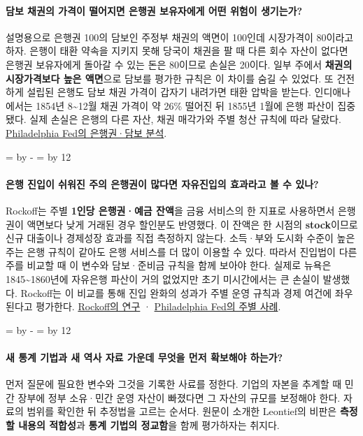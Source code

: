 \documentclass[10pt,a4paper]{article}
\newcommand{\ReserveQuestionSpace}{%
  \par\begingroup
  \dimen0=\pagegoal \advance\dimen0 by -\pagetotal
  \dimen2=\baselineskip \multiply\dimen2 by 12
  \ifdim\dimen0<\dimen2 \newpage\fi
  \endgroup}
\begin{document}
\paragraph{담보 채권의 가격이 떨어지면 은행권 보유자에게 어떤 위험이 생기는가?}
설명용으로 은행권 100의 담보인 주정부 채권의 액면이 100인데 시장가격이 80이라고 하자. 은행이 태환 약속을 지키지 못해 당국이 채권을 팔 때 다른 회수 자산이 없다면 은행권 보유자에게 돌아갈 수 있는 돈은 80이므로 손실은 20이다. 일부 주에서 \textbf{채권의 시장가격보다 높은 액면}으로 담보를 평가한 규칙은 이 차이를 숨길 수 있었다. 또 건전하게 설립된 은행도 담보 채권 가격이 갑자기 내려가면 태환 압박을 받는다. 인디애나에서는 1854년 8\textasciitilde{}12월 채권 가격이 약 26\% 떨어진 뒤 1855년 1월에 은행 파산이 집중됐다. 실제 손실은 은행의 다른 자산, 채권 매각가와 주별 청산 규칙에 따라 달랐다. \href{https://www.philadelphiafed.org/-/media/FRBP/Assets/Economy/Articles/economic-insights/2016/q3/eiq316\_free\_banking\_era.pdf}{Philadelphia Fed의 은행권·담보 분석}.\par

\ReserveQuestionSpace
\paragraph{은행 진입이 쉬워진 주의 은행권이 많다면 자유진입의 효과라고 볼 수 있나?}
Rockoff는 주별 \textbf{1인당 은행권·예금 잔액}을 금융 서비스의 한 지표로 사용하면서 은행권이 액면보다 낮게 거래된 경우 할인분도 반영했다. 이 잔액은 한 시점의 \textbf{stock}이므로 신규 대출이나 경제성장 효과를 직접 측정하지 않는다. 소득·부와 도시화 수준이 높은 주는 은행 규칙이 같아도 은행 서비스를 더 많이 이용할 수 있다. 따라서 진입법이 다른 주를 비교할 때 이 변수와 담보·준비금 규칙을 함께 보아야 한다. 실제로 뉴욕은 1845\textasciitilde{}1860년에 자유은행 파산이 거의 없었지만 초기 미시간에서는 큰 손실이 발생했다. Rockoff는 이 비교를 통해 진입 완화의 성과가 주별 운영 규칙과 경제 여건에 좌우된다고 평가한다. \href{https://legacy.voteview.com/pdf/Rockoff\_1975\_Banking\_1840-1860.pdf}{Rockoff의 연구} · \href{https://www.philadelphiafed.org/-/media/FRBP/Assets/Economy/Articles/economic-insights/2016/q3/eiq316\_free\_banking\_era.pdf}{Philadelphia Fed의 주별 사례}.\par

\ReserveQuestionSpace
\paragraph{새 통계 기법과 새 역사 자료 가운데 무엇을 먼저 확보해야 하는가?}
먼저 질문에 필요한 변수와 그것을 기록한 사료를 정한다. 기업의 자본을 추계할 때 민간 장부에 정부 소유·민간 운영 자산이 빠졌다면 그 자산의 규모를 보정해야 한다. 자료의 범위를 확인한 뒤 추정법을 고르는 순서다. 원문이 소개한 Leontief의 비판은 \textbf{측정할 내용의 적합성}과 \textbf{통계 기법의 정교함}을 함께 평가하자는 취지다.\par
\end{document}
